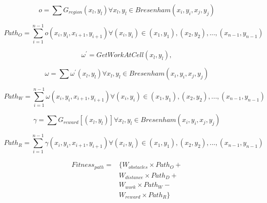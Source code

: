 \documentclass{tamuccthesis}
\begin{document}
\begin{equation}
o = \sum G_{region}(x_l, y_l) \forall x_l, y_l \in Bresenham(x_i, y_i, x_j, y_j) 
\label{eq_obstacles}
\end{equation}

\begin{equation}
Path_{O} = \sum_{i=1}^{n-1} o (x_{i}, y_{i}, x_{i+1}, y_{i+1}) \forall (x_{i}, y_{i}) \in (x_{1}, y_{1}), (x_{2}, y_{2}), ..., (x_{n-1}, y_{n-1})
\label{eq_path_obstacles}
\end{equation}

\begin{equation}
\omega^{'} = GetWorkAtCell(x_l, y_l), 
\label{eq_work_prime}
\end{equation}

\begin{equation}
\omega = \sum \omega^{'}(x_l, y_l) \forall x_l, y_l \in Bresenham(x_i, y_i, x_j, y_j) 
\label{eq_work}
\end{equation}

\begin{equation}
Path_{W} = \sum_{i=1}^{n-1} \omega (x_{i}, y_{i}, x_{i+1}, y_{i+1}) \forall (x_{i}, y_{i}) \in (x_{1}, y_{1}), (x_{2}, y_{2}), ..., (x_{n-1}, y_{n-1})
\label{eq_path_work}
\end{equation}

\begin{equation}
\gamma = \sum G_{reward}[(x_l, y_l)] \forall x_l, y_l \in Bresenham(x_i, y_i, x_j, y_j)
\label{eq_reward}
\end{equation}

\begin{equation}
Path_{R} = \sum_{i=1}^{n-1} \gamma (x_{i}, y_{i}, x_{i+1}, y_{i+1}) \forall (x_{i}, y_{i}) \in (x_{1}, y_{1}), (x_{2}, y_{2}), ..., (x_{n-1}, y_{n-1})
\label{eq_path_reward}
\end{equation}


\begin{equation}
\begin{aligned}
Fitness_{path} ={} & \{W_{obstacles} \times Path_{O} + \\ 
                    &  W_{distance} \times Path_{D}  + \\
                    &  W_{work} \times Path_{W}     - \\
                    &  W_{reward} \times Path_{R}\}
\end{aligned}
\label{fitness_function}
\end{equation}
\end{document}
